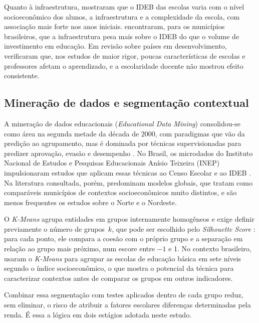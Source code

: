 Quanto à infraestrutura, \textcite{alves2013} mostraram que o IDEB das escolas varia com o nível socioeconômico dos alunos, a infraestrutura e a complexidade da escola, com associação mais forte nos anos iniciais. \textcite{vasconcelos2021} encontraram, para os municípios brasileiros, que a infraestrutura pesa mais sobre o IDEB do que o volume de investimento em educação. Em revisão sobre países em desenvolvimento, \textcite{glewwe2013} verificaram que, nos estudos de maior rigor, poucas características de escolas e professores afetam o aprendizado, e a escolaridade docente não mostrou efeito consistente.

\subsection{Mineração de dados e segmentação contextual}

A mineração de dados educacionais (\textit{Educational Data Mining}) consolidou-se como área na segunda metade da década de 2000, com paradigmas que vão da predição ao agrupamento, mas é dominada por técnicas supervisionadas para predizer aprovação, evasão e desempenho \parencite{romero2020}. No Brasil, os microdados do Instituto Nacional de Estudos e Pesquisas Educacionais Anísio Teixeira (INEP) impulsionaram estudos que aplicam essas técnicas ao Censo Escolar e ao IDEB \parencite{colpani2018}. Na literatura consultada, porém, predominam modelos globais, que tratam como comparáveis municípios de contextos socioeconômicos muito distintos, e são menos frequentes os estudos sobre o Norte e o Nordeste.

O \textit{K-Means} \parencite{macqueen1967} agrupa entidades em grupos internamente homogêneos e exige definir previamente o número de grupos~$k$, que pode ser escolhido pelo \textit{Silhouette Score} \parencite{rousseeuw1987}: para cada ponto, ele compara a coesão com o próprio grupo e a separação em relação ao grupo mais próximo, num escore entre $-1$ e 1. No contexto brasileiro, \textcite{alves2014} usaram o \textit{K-Means} para agrupar as escolas de educação básica em sete níveis segundo o índice socioeconômico, o que mostra o potencial da técnica para caracterizar contextos antes de comparar os grupos em outros indicadores.

Combinar essa segmentação com testes aplicados dentro de cada grupo reduz, sem eliminar, o risco de atribuir a fatores escolares diferenças determinadas pela renda. É essa a lógica em dois estágios adotada neste estudo.
